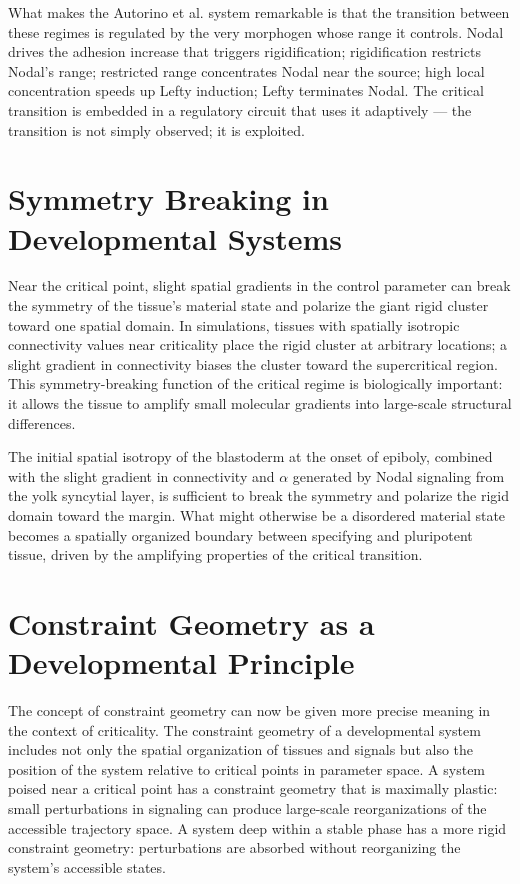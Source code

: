 \documentclass[12pt, a4paper, openany]{book}
\theoremstyle{definition}
\theoremstyle{remark}
\begin{document}
What makes the Autorino et al. system remarkable is that the transition between these regimes is regulated by the very morphogen whose range it controls. Nodal drives the adhesion increase that triggers rigidification; rigidification restricts Nodal's range; restricted range concentrates Nodal near the source; high local concentration speeds up Lefty induction; Lefty terminates Nodal. The critical transition is embedded in a regulatory circuit that uses it adaptively — the transition is not simply observed; it is exploited.

\section{Symmetry Breaking in Developmental Systems}

Near the critical point, slight spatial gradients in the control parameter can break the symmetry of the tissue's material state and polarize the giant rigid cluster toward one spatial domain. In simulations, tissues with spatially isotropic connectivity values near criticality place the rigid cluster at arbitrary locations; a slight gradient in connectivity biases the cluster toward the supercritical region. This symmetry-breaking function of the critical regime is biologically important: it allows the tissue to amplify small molecular gradients into large-scale structural differences.

The initial spatial isotropy of the blastoderm at the onset of epiboly, combined with the slight gradient in connectivity and $\alpha$ generated by Nodal signaling from the yolk syncytial layer, is sufficient to break the symmetry and polarize the rigid domain toward the margin. What might otherwise be a disordered material state becomes a spatially organized boundary between specifying and pluripotent tissue, driven by the amplifying properties of the critical transition.

\section{Constraint Geometry as a Developmental Principle}

The concept of constraint geometry can now be given more precise meaning in the context of criticality. The constraint geometry of a developmental system includes not only the spatial organization of tissues and signals but also the position of the system relative to critical points in parameter space. A system poised near a critical point has a constraint geometry that is maximally plastic: small perturbations in signaling can produce large-scale reorganizations of the accessible trajectory space. A system deep within a stable phase has a more rigid constraint geometry: perturbations are absorbed without reorganizing the system's accessible states.
\end{document}
